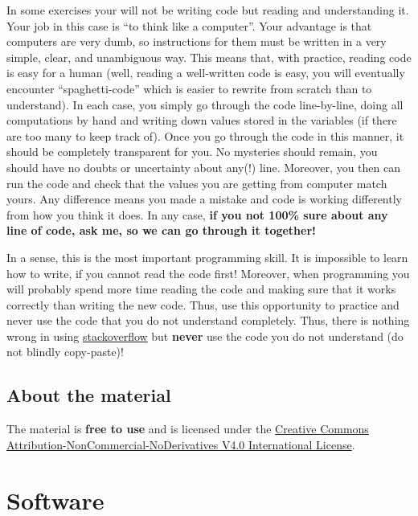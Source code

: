 \documentclass[
]{book}
\begin{document}
In some exercises your will not be writing code but reading and understanding it. Your job in this case is ``to think like a computer''. Your advantage is that computers are very dumb, so instructions for them must be written in a very simple, clear, and unambiguous way. This means that, with practice, reading code is easy for a human (well, reading a well-written code is easy, you will eventually encounter ``spaghetti-code'' which is easier to rewrite from scratch than to understand). In each case, you simply go through the code line-by-line, doing all computations by hand and writing down values stored in the variables (if there are too many to keep track of). Once you go through the code in this manner, it should be completely transparent for you. No mysteries should remain, you should have no doubts or uncertainty about any(!) line. Moreover, you then can run the code and check that the values you are getting from computer match yours. Any difference means you made a mistake and code is working differently from how you think it does. In any case, \textbf{if you not 100\% sure about any line of code, ask me, so we can go through it together!}

In a sense, this is the most important programming skill. It is impossible to learn how to write, if you cannot read the code first! Moreover, when programming you will probably spend more time reading the code and making sure that it works correctly than writing the new code. Thus, use this opportunity to practice and never use the code that you do not understand completely. Thus, there is nothing wrong in using \href{https://stackoverflow.com/}{stackoverflow} but \textbf{never} use the code you do not understand (do not blindly copy-paste)!

\hypertarget{about-the-material}{%
\section*{About the material}\label{about-the-material}}

The material is \textbf{free to use} and is licensed under the \href{https://creativecommons.org/licenses/by-nc-nd/4.0/}{Creative Commons Attribution-NonCommercial-NoDerivatives V4.0 International License}.

\hypertarget{software}{%
\chapter*{Software}\label{software}}
\end{document}
